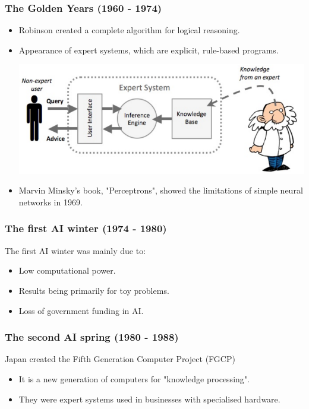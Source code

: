 \documentclass[11pt]{article}
\begin{document}
\subsubsection{The Golden Years (1960 - 1974)}
\label{sec:org4159e77}
\begin{itemize}
\item Robinson created a complete algorithm for logical reasoning.
\item Appearance of expert systems, which are explicit, rule-based programs.
\begin{center}
\includegraphics[width=.9\linewidth]{./images/expert-system-diagram.png}
\end{center}
\item Marvin Minsky's book, "Perceptrons", showed the limitations of simple neural networks in 1969.
\end{itemize}
\subsubsection{The first AI winter (1974 - 1980)}
\label{sec:orgd246945}
The first AI winter was mainly due to:
\begin{itemize}
\item Low computational power.
\item Results being primarily for toy problems.
\item Loss of government funding in AI.
\end{itemize}

 \newpage
\subsubsection{The second AI spring (1980 - 1988)}
\label{sec:org6d92cc9}
Japan created the Fifth Generation Computer Project (FGCP)
\begin{itemize}
\item It is a new generation of computers for "knowledge processing".
\item They were expert systems used in businesses with specialised hardware.
\end{itemize}
\end{document}
